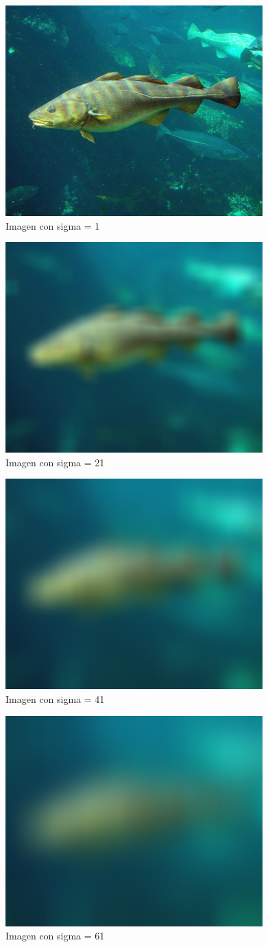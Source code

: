 \begin{figure}[H]
\centering
\includegraphics[width=0.5\linewidth]{a1}
\caption{Imagen con sigma = 1}
\label{fig:a1}
\end{figure}

\begin{figure}[H]
	\centering
	\includegraphics[width=0.5\linewidth]{A2}
	\caption{Imagen con sigma = 21}
	\label{fig:a2}
\end{figure}

\begin{figure}[H]
	\centering
	\includegraphics[width=0.5\linewidth]{a3}
	\caption{Imagen con sigma = 41}
	\label{fig:a3}
\end{figure}

\begin{figure}[H]
	\centering
	\includegraphics[width=0.5\linewidth]{a4}
	\caption{Imagen con sigma = 61}
	\label{fig:a4}
\end{figure}

